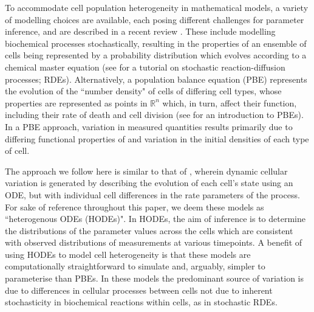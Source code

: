 \documentclass[10pt,letterpaper]{article}
\begin{document}
To accommodate cell population heterogeneity in mathematical models, a variety of modelling choices are available, each posing different challenges for parameter inference, and are described in a recent review \cite{waldherr2018estimation}. These include modelling biochemical processes stochastically, resulting in the properties of an ensemble of cells being represented by a probability distribution which evolves according to a chemical master equation (see \cite{erban2007practical} for a tutorial on stochastic reaction-diffusion processes; RDEs). Alternatively, a population balance equation (PBE) represents the evolution of the ``number density" of cells of differing cell types, whose properties are represented as points in $\mathbb{R}^n$ which, in turn, affect their function, including their rate of death and cell division (see \cite{ramkrishna2014population} for an introduction to PBEs). In a PBE approach, variation in measured quantities results primarily due to differing functional properties of and variation in the initial densities of each type of cell. 

The approach we follow here is similar to that of \cite{dixit2018maximum}, wherein dynamic cellular variation is generated by describing the evolution of each cell's state using an ODE, but with individual cell differences in the rate parameters of the process. For sake of reference throughout this paper, we deem these models as ``heterogenous ODEs (HODEs)". In HODEs, the aim of inference is to determine the distributions of the parameter values across the cells which are consistent with observed distributions of measurements at various timepoints. A benefit of using HODEs to model cell heterogeneity is that these models are computationally straightforward to simulate and, arguably, simpler to parameterise than PBEs. In these models the predominant source of variation is due to differences in cellular processes between cells not due to inherent stochasticity in biochemical reactions within cells, as in stochastic RDEs.
\end{document}
